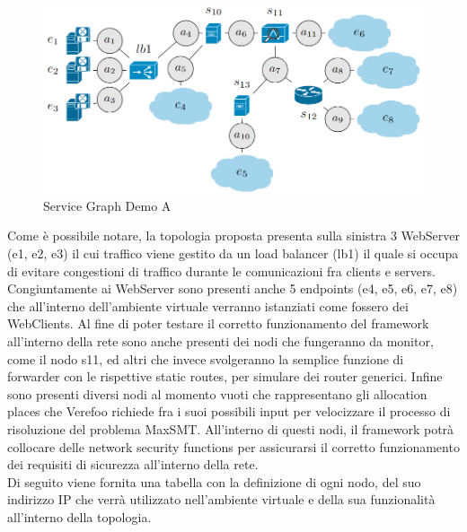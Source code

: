 \begin{figure}[h]  %
    \centering
    \includegraphics[width=1\textwidth]{VPN_AG.PNG} 
    \caption{Service Graph Demo A}
    \label{fig:ServiceGraph}
\end{figure}
Come è possibile notare, la topologia proposta presenta sulla sinistra 3 WebServer (e1, e2, e3) il cui traffico viene gestito da un load balancer (lb1) il quale si occupa di evitare congestioni di traffico durante le comunicazioni fra clients e servers. 
Congiuntamente ai WebServer sono presenti anche 5 endpoints (e4, e5, e6, e7, e8) che all'interno dell'ambiente virtuale verranno istanziati come fossero dei WebClients. 
Al fine di poter testare il corretto funzionamento del framework all'interno della rete sono anche presenti dei nodi che fungeranno da monitor, come il nodo  s11, ed altri che invece svolgeranno la semplice funzione di forwarder con le rispettive static routes, per simulare dei router generici. 
Infine sono presenti diversi nodi al momento vuoti che rappresentano gli  allocation places che Verefoo richiede fra i suoi possibili input per velocizzare il processo di risoluzione del problema MaxSMT. All'interno di questi nodi, il framework potrà collocare delle network security functions per assicurarsi 
il corretto funzionamento dei requisiti di sicurezza all'interno della rete.\\ Di seguito viene fornita una tabella con la definizione di ogni nodo, del suo indirizzo IP che verrà utilizzato nell'ambiente virtuale e della sua funzionalità all'interno della topologia. \\

